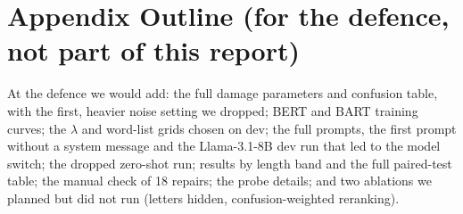 \section*{Appendix Outline (for the defence, not part of this report)}
At the defence we would add: the full damage parameters and confusion table, with the first, heavier noise setting
we dropped; BERT and BART training curves; the $\lambda$ and word-list grids chosen on dev; the full prompts, the
first prompt without a system message and the Llama-3.1-8B dev run that led to the model switch; the dropped
zero-shot run; results by length band and the full paired-test table; the manual check of 18 repairs; the probe
details; and two ablations we planned but did not run (letters hidden, confusion-weighted reranking).

